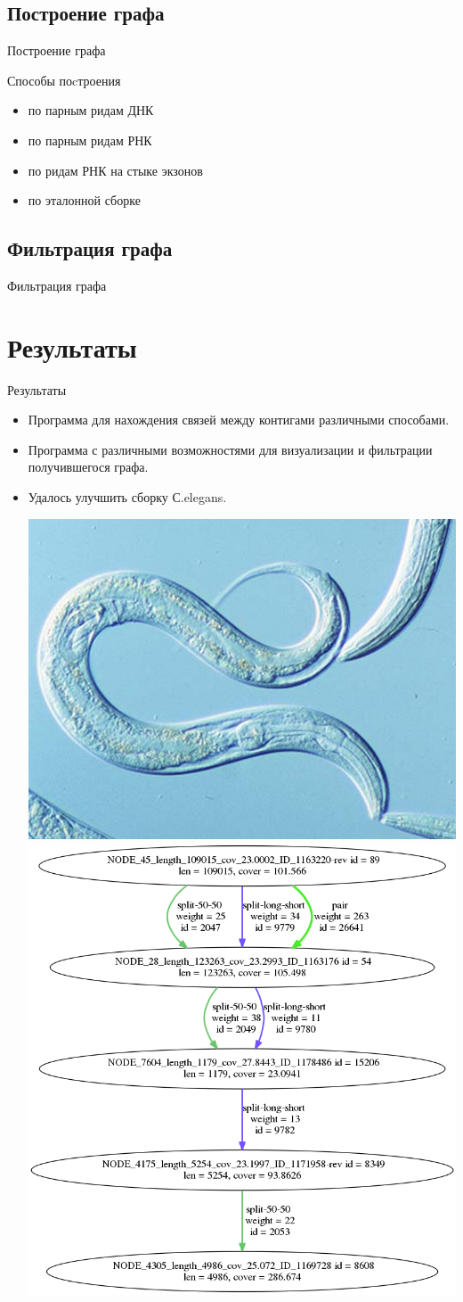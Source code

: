\documentclass{beamer}
\newcommand{\cimg}[2]{%
	\begin{center}%
		\ifthenelse{\equal{#2}{}}{%
			\texttt{[image: \#1]}
		}{%
			\texttt{[image: \#1]}
		}%
	\end{center}%
}
\begin{document}
\subsection{Построение графа}
\begin{frame}[t]{Построение графа}
\cimg{BuilderClassDiagram.jpg}{1}	
\end{frame}
\begin{frame}[t]{Способы поcтроения}
\begin{itemize}
	\item по парным ридам ДНК
	\item по парным ридам РНК
	\item по ридам РНК на стыке экзонов
	\item по эталонной сборке
\end{itemize}
\cimg{p5.png}{1.21}
\end{frame}

\subsection{Фильтрация графа}
\begin{frame}[t]{Фильтрация графа}
	\cimg{FilterClassDiagram.jpg}{1}
\end{frame}

\section{Результаты}
\begin{frame}[t]{Результаты}
	\begin{itemize}
		\item Программа для нахождения связей
		между контигами различными способами. 
		\item Программа с различными возможностями для 
		визуализации и фильтрации получившегося графа. 
		\item Удалось улучшить сборку С.elegans.
		\begin{center}
		\includegraphics[width=0.35\linewidth]{celegans.jpg}
		\includegraphics[width=0.35\linewidth]{celegExmp.png}
		\end{center}
	\end{itemize}
\end{frame}
\end{document}
